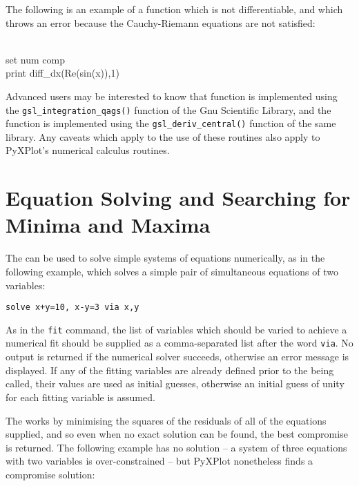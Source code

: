 The following is an example of a function which is not differentiable, and
which throws an error because the Cauchy-Riemann equations are not satisfied:

\begin{dontdo}\\
set num comp\\
print diff\_dx(Re(sin(x)),1)
\end{dontdo}

Advanced users may be interested to know that  function is
implemented using the {\tt gsl\_integration\_qags()} function of the Gnu
Scientific Library, and the  function is
implemented using the {\tt gsl\_deriv\_central()} function of the same library.
Any caveats which apply to the use of these routines also apply to PyXPlot's
numerical calculus routines.


\section{Equation Solving and Searching for Minima and Maxima}

The  can be used to solve simple systems of
equations numerically, as in the following example, which solves a simple pair of
simultaneous equations of two variables:

\begin{verbatim}
solve x+y=10, x-y=3 via x,y
\end{verbatim}

\noindent As in the {\tt fit} command, the list of variables which should be
varied to achieve a numerical fit should be supplied as a comma-separated list
after the word {\tt via}. No output is returned if the numerical solver
succeeds, otherwise an error message is displayed. If any of the fitting
variables are already defined prior to the  being called, their
values are used as initial guesses, otherwise an initial guess of unity for each
fitting variable is assumed.

The  works by minimising the squares of the residuals of all of the
equations supplied, and so even when no exact solution can be found, the best
compromise is returned. The following example has no solution -- a system of
three equations with two variables is over-constrained -- but PyXPlot
nonetheless finds a compromise solution:

